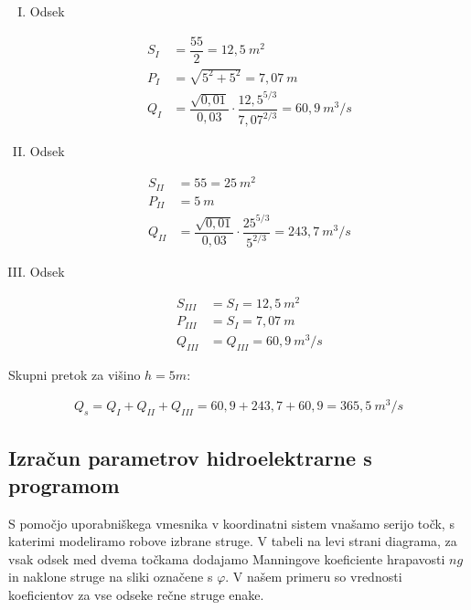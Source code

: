 \begin{enumerate}[I.]
	
	\item Odsek
	
	\begin{ceqn}
		\begin{align}
			S_I&=\dfrac{5  5}{2} = 12,5~m^2\\
			P_I&=\sqrt{5^2 + 5^2} = 7,07~m\\
			Q_I&=\dfrac{\sqrt{0,01}}{0,03} \cdot \dfrac{12,5^{5/3}}{7,07^{2/3}} = 60,9~m^3/s
		\end{align}
	\end{ceqn}
		
	\item Odsek
	
	\begin{ceqn}
		\begin{align}
			S_{II}&=55 = 25 ~m^2\\
			P_{II}&=5~m\\
			Q_{II}&=\dfrac{\sqrt{0,01}}{0,03} \cdot \dfrac{25^{5/3}}{5^{2/3}} = 243,7~m^3/s
		\end{align}
	\end{ceqn}
	
	\item Odsek
	\begin{ceqn}
		\begin{align}
		S_{III}&=S_{I} = 12,5~m^2\\
		P_{III}&=S_{I} = 7,07~m\\
		Q_{III}&=Q_{III} = 60,9~m^3/s
		\end{align}
	\end{ceqn}
	
\end{enumerate}

Skupni pretok za višino $h=5m$:

\begin{ceqn}
 \begin{align}
Q_{s} = Q_{I} + Q_{II} + Q_{III} = 60,9 + 243,7 + 60,9 = 365,5~m^3/s
 \end{align}
 \end{ceqn}




\subsection{Izračun parametrov hidroelektrarne s programom}

S pomočjo uporabniškega vmesnika v koordinatni sistem vnašamo serijo točk, s katerimi modeliramo robove izbrane struge. V tabeli na levi strani diagrama, za vsak odsek med dvema točkama dodajamo Manningove koeficiente hrapavosti $ng$ in naklone struge na sliki označene s $\varphi$. V našem primeru so vrednosti koeficientov za vse odseke rečne struge enake.

